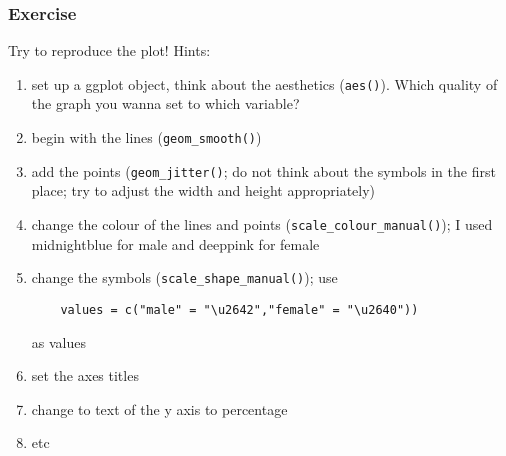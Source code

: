 \begin{frame}[fragile]\frametitle{Exercise}
Try to reproduce the plot! Hints:
  \begin{enumerate}
  \item set up a ggplot object, think about the aesthetics (\texttt{aes()}). Which quality of the graph you wanna set to which variable?
  \item begin with the lines (\texttt{geom\_smooth()})
  \item add the points (\texttt{geom\_jitter()}; do not think about the symbols in the first place; try to adjust the width and height appropriately)
  \item change the colour of the lines and points (\texttt{scale\_colour\_manual()}); I used midnightblue for male and deeppink for female
  \item change the symbols (\texttt{scale\_shape\_manual()}); use
\begin{verbatim}
    values = c("male" = "\u2642","female" = "\u2640"))
\end{verbatim}
     as values
  \item set the axes titles
  \item change to text of the y axis to percentage
  \item etc
  \end{enumerate}
\end{frame}


